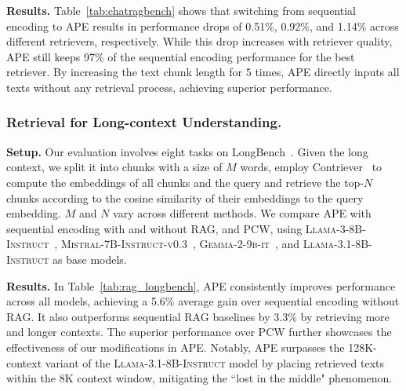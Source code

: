 \textbf{Results.} Table~\ref{tab:chatragbench} shows that switching from sequential encoding to APE results in performance drops of 0.51\%, 0.92\%, and 1.14\% across different retrievers, respectively. While this drop increases with retriever quality, APE still keeps 97\% of the sequential encoding performance for the best retriever. By increasing the text chunk length for $5$ times, APE directly inputs all texts without any retrieval process, achieving superior performance.



\subsubsection{Retrieval for Long-context Understanding.}

\textbf{Setup.} Our evaluation involves eight tasks on LongBench~\citep{bai2023longbench}. Given the long context,  we split it into chunks with a size of $M$ words, employ Contriever~\citep{izacard2021unsupervised} to compute the embeddings of all
chunks and the query and retrieve the top-$N$ chunks according to the cosine similarity of
their embeddings to the query embedding. $M$ and $N$ vary across different methods. We compare APE with sequential encoding with and without RAG, and PCW, using \textsc{Llama-3-8B-Instruct}~\citep{llama3}, \textsc{Mistral-7B-Instruct-v0.3}~\citep{jiang2023mistral}, \textsc{Gemma-2-9b-it}~\citep{gemma2}, and \textsc{Llama-3.1-8B-Instruct} as base models. 



\textbf{Results.} In Table~\ref{tab:rag_longbench}, APE consistently improves performance across all models, achieving a 5.6\% average gain over sequential encoding without RAG. It also outperforms sequential RAG baselines by 3.3\% by retrieving more and longer contexts. The superior performance over PCW further showcases the effectiveness of our modifications in APE. Notably, APE surpasses the 128K-context variant of the \textsc{Llama-3.1-8B-Instruct} model by placing retrieved texts within the 8K context window, mitigating the ``lost in the middle" phenomenon.


